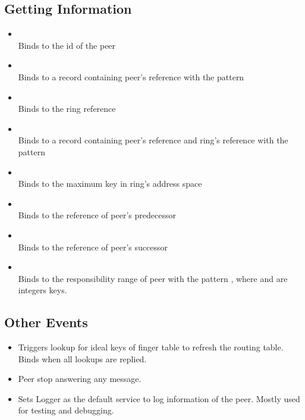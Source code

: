 \subsection{Getting Information}

\begin{itemize}

\item {}\\ Binds  to the id of the peer

\item {}\\ Binds  to a record containing peer's
reference with the pattern\\ 

\item {}\\ Binds  to the ring reference

\item {}\\ Binds  to a record containing peer's
reference and ring's reference with the pattern  

\item {}\\ Binds  to the maximum key in ring's
address space

\item {}\\ Binds  to the reference of peer's
predecessor

\item {}\\ Binds  to the reference of peer's
successor

\item {}\\ Binds  to the responsibility range of
peer with the pattern , where  and  are
integers keys.

\end{itemize}

\subsection{Other Events}

\begin{itemize}

\item {} Triggers lookup for ideal keys of finger
table to refresh the routing table. Binds  when all lookups are
replied.

\item {} Peer stop answering any message. 

\item {} Sets Logger as the default service to log
information of the peer. Mostly used for testing and debugging.

\end{itemize}


